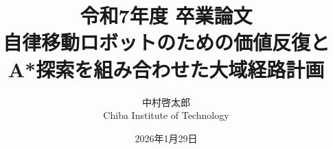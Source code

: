 \documentclass[a4paper,11pt]{jsbook}
\begin{document}
\title{令和7年度 卒業論文 \\
    自律移動ロボットのための価値反復と\\
    A*探索を組み合わせた大域経路計画 \\
}


\author{中村啓太郎\\
    Chiba Institute of Technology}


\date{2026年1月29日}

\maketitle





\tableofcontents



\cleardoublepage
{}










\appendix





\newpage

\end{document}

